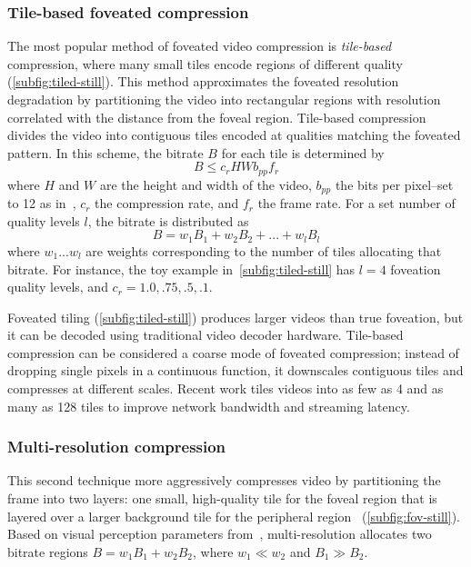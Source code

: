 \subsubsection{Tile-based foveated compression}
The most popular method of foveated video compression is \emph{tile-based} compression, where many small tiles encode regions of different quality (\ref{subfig:tiled-still}).
This method approximates the foveated resolution degradation by partitioning the video into rectangular regions with resolution correlated with the distance from the foveal region.
Tile-based compression divides the video into contiguous tiles encoded at qualities matching the foveated pattern.
In this scheme, the bitrate $B$ for each tile is determined by
\begin{equation}
    B \leq c_{r}HWb_{pp}f_{r}
\end{equation}
where $H$ and $W$ are the height and width of the video, $b_{pp}$ the bits per pixel--set to 12 as in~\cite{kaplanyan2019deepfovea}, $c_r$ the compression rate, and $f_r$ the frame rate.
For a set number of quality levels $l$, the bitrate is distributed as
\begin{equation}B = w_{1}B_{1} + w_{2}B_{2} + ... + w_{l}B_{l}
\end{equation}
where $w_{1} ... w_{l}$ are weights corresponding to the number of tiles allocating that bitrate.
For instance, the toy example in~\ref{subfig:tiled-still} has $l=4$ foveation quality levels, and $c_r = {1.0, .75, .5, .1}$.

Foveated tiling (\ref{subfig:tiled-still}) produces larger videos than true foveation, but it can be decoded using traditional video decoder hardware.
Tile-based compression can be considered a coarse mode of foveated compression; instead of dropping single pixels in a continuous function, it downscales contiguous tiles and compresses at different scales.
Recent work tiles videos into as few as 4 and as many as 128 tiles to improve network bandwidth and streaming latency.

\subsubsection{Multi-resolution compression} This second technique more aggressively compresses video by partitioning the frame into two layers: one small, high-quality tile for the foveal region that is layered over a larger background tile for the peripheral region~\cite{guenter2012foveated}  (\ref{subfig:fov-still}).
Based on visual perception parameters from~\cite{guenter2012foveated}, multi-resolution allocates two bitrate regions $B = w_{1}B_{1} + w_{2}B_{2}$, where $w_{1} \ll w_{2}$ and $B_{1} \gg B_{2}$.

